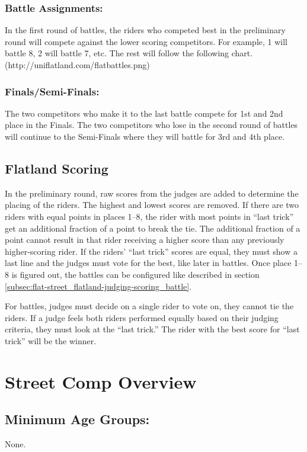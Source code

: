 \subsubsection{Battle Assignments:}
In the first round of battles, the riders who competed best in the preliminary round will compete against the lower scoring competitors.
For example, 1 will battle 8, 2 will battle 7, etc.
The rest will follow the following chart. (http://uniflatland.com/flatbattles.png)

\subsubsection{Finals/Semi-Finals:}
The two competitors who make it to the last battle compete for 1st and 2nd place in the Finals.
The two competitors who lose in the second round of battles will continue to the Semi-Finals where they will battle for 3rd and 4th place.

\subsection{Flatland Scoring}
In the preliminary round, raw scores from the judges are added to determine the placing of the riders.
The highest and lowest scores are removed.
If there are two riders with equal points in places 1–8, the rider with most points in ``last trick'' get an additional fraction of a point to break the tie.
The additional fraction of a point cannot result in that rider receiving a higher score than any previously higher-scoring rider.
If the riders' ``last trick'' scores are equal, they must show a last line and the judges must vote for the best, like later in battles.
Once place 1–8 is figured out, the battles can be configured like described in section \ref{subsec:flat-street_flatland-judging-scoring_battle}.

For battles, judges must decide on a single rider to vote on, they cannot tie the riders.
If a judge feels both riders performed equally based on their judging criteria, they must look at the ``last trick.''
The rider with the best score for ``last trick'' will be the winner.
 
\section{Street Comp Overview}

\subsection{Minimum Age Groups:}
None.

